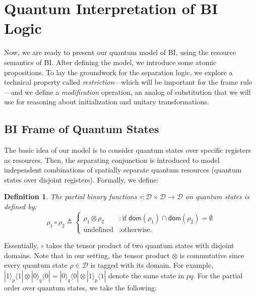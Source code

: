 \documentclass[conference,compsoc, 10pt]{IEEEtran}
\newtheorem{definition}{Definition}[section]
\newcommand {\cD } {{\mathcal{D}}}
\newcommand {\doms } {{\mathsf{dom}}}
\newcommand {\dom }[1] {{\mathsf{dom}\!\left(#1\right)}}
\def\>{\ensuremath{\rangle}}
\def\<{\ensuremath{\langle}}
\begin{document}
	\section{Quantum Interpretation of BI Logic}\label{sec-q-interpret}
	
  Now, we are ready to present our quantum model of BI, using the
  resource semantics of BI. After defining the model, we introduce some atomic
  propositions. To lay the groundwork for the separation logic, we explore a
  technical property called \emph{restriction}---which will be important for the
  frame rule---and we define a \emph{modification} operation, an analog of
  substitution that we will use for reasoning about initialization and unitary
  transformations.
	
	\subsection{BI Frame of Quantum States}
	
  The basic idea of our model is to consider quantum states over specific
  registers as resources. Then, the separating conjunction is introduced to
  model independent combinations of spatially separate quantum resources
  (quantum states over disjoint registers). Formally, we define:
	
	\begin{definition}
		\label{def tensor coupling}
		The partial binary functions $\circ: \cD\times\cD\rightarrow \cD$ on quantum
    states is defined by:
    \[
      \rho_1\circ\rho_2 \triangleq
      \begin{cases}
        \rho_1 \otimes \rho_2 &: \text{if } \dom{\rho_1}\cap \dom{\rho_2}=\emptyset \\
        \text{undefined} &: \text{otherwise.}
      \end{cases}
    \]
	\end{definition}	
	
  Essentially, $\circ$ takes the tensor product of two quantum states with
  disjoint domains. Note that in our setting, the tensor product $\otimes$ is
  commutative since every quantum state $\rho\in\cD$ is tagged with its domain.
  For example, $|1\>_p\<1|\otimes|0\>_q\<0| = |0\>_q\<0|\otimes|1\>_p\<1|$
  denote the same state in $pq$. For the partial order over quantum states, we
  take the following:	
\end{document}
